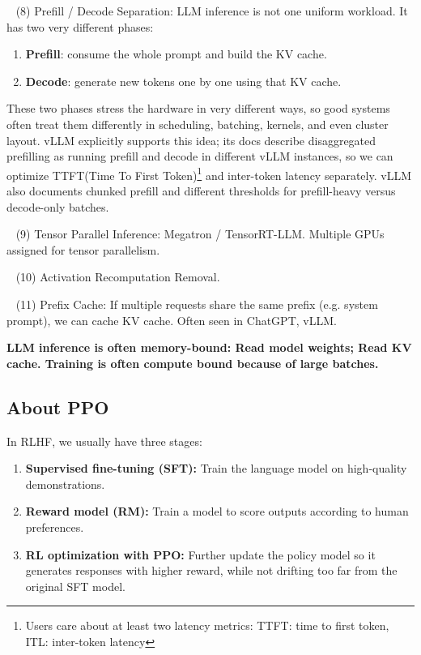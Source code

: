 \documentclass[11pt]{article}  %
\begin{document}
\textbullet~ (8) Prefill / Decode Separation: 
LLM inference is not one uniform workload. It has two very different phases:
\begin{enumerate}
  \item \textbf{Prefill}: consume the whole prompt and build the KV cache.
  \item \textbf{Decode}: generate new tokens one by one using that KV cache.
\end{enumerate}
These two phases stress the hardware in very different ways, so good systems often treat them differently in scheduling, batching, kernels, and even cluster layout.
vLLM explicitly supports this idea; its docs describe disaggregated prefilling as running prefill and decode in different vLLM instances, so we can optimize TTFT(Time To First Token)\footnote{Users care about at least two latency metrics: TTFT: time to first token, ITL: inter-token latency} and inter-token latency separately. vLLM also documents chunked prefill and different thresholds for prefill-heavy versus decode-only batches.

\textbullet~ (9) Tensor Parallel Inference: Megatron / TensorRT-LLM. Multiple GPUs assigned for tensor parallelism.

\textbullet~ (10) Activation Recomputation Removal.

\textbullet~ (11) Prefix Cache: If multiple requests share the same prefix (e.g. system prompt), we can cache KV cache. Often seen in ChatGPT, vLLM.


\textbf{LLM inference is often memory-bound: Read model weights; Read KV cache. Training is often compute bound because of large batches.}


\subsection{About PPO}
In RLHF, we usually have three stages:
\begin{enumerate}
  \item \textbf{Supervised fine-tuning (SFT):} Train the language model on high-quality demonstrations.
  \item \textbf{Reward model (RM):} Train a model to score outputs according to human preferences.
  \item \textbf{RL optimization with PPO:} Further update the policy model so it generates responses with higher reward, while not drifting too far from the original SFT model.
\end{enumerate}
\end{document}
